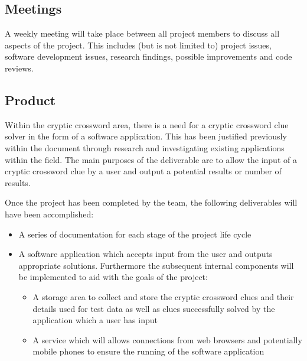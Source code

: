 \subsection{Meetings}

A weekly meeting will take place between all project members to discuss all aspects of the project. This includes (but is not limited to) project issues, software development issues, research findings, possible improvements and code reviews.

\subsection{Product}
Within the cryptic crossword area, there is a need for a cryptic crossword clue solver in the form of a software application. 
This has been justified previously within the document through research and investigating existing applications within
the field. The main purposes of the deliverable are to allow the input of a cryptic crossword clue by a user and output
a potential results or number of results. 

Once the project has been completed by the team, the following deliverables will have been accomplished:
\begin{itemize}
	\item A series of documentation for each stage of the project life cycle
	\item A software application which accepts input from the user and outputs appropriate solutions. 
Furthermore the subsequent internal components will be implemented to aid with the goals of the project:
	\begin{itemize}
		\item A storage area to collect and store the cryptic crossword clues and their details used for test data as well as
clues successfully solved by the application which a user has input
		\item A service which will allows connections from web browsers and potentially mobile phones
to ensure the running of the software application
	\end{itemize}
\end{itemize}

